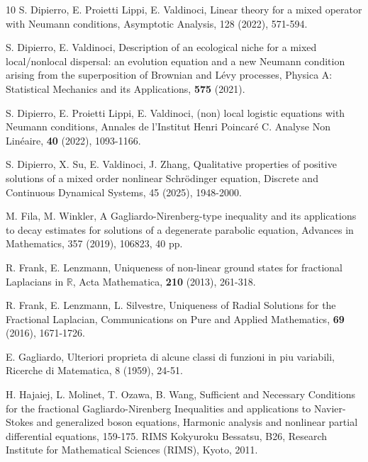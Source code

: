 \documentclass[12pt,a4paper,reqno]{amsart}
\numberwithin{equation}{section}
\begin{document}
\begin{thebibliography}{10}
S. Dipierro, E. Proietti Lippi, E. Valdinoci,
Linear theory for a mixed operator with Neumann conditions,
Asymptotic Analysis,
128 (2022), 571-594.

S. Dipierro, E. Valdinoci,
Description of an ecological niche for a mixed local/nonlocal dispersal: an evolution equation and a new Neumann condition arising from the superposition of Brownian and L\'{e}vy processes,
Physica A: Statistical Mechanics and its Applications,
\textbf{575} (2021).

S. Dipierro, E. Proietti Lippi, E. Valdinoci,
(non) local logistic equations with Neumann conditions,
Annales de l'Institut Henri Poincar\'{e} C. Analyse Non Lin\'{e}aire,
\textbf{40} (2022), 1093-1166.



S. Dipierro, X. Su, E. Valdinoci, J. Zhang,
Qualitative properties of positive solutions of a mixed order nonlinear Schr\"{o}dinger equation,
Discrete and Continuous Dynamical Systems,
45 (2025), 1948-2000.


M. Fila, M. Winkler,
A Gagliardo-Nirenberg-type inequality and its applications to decay estimates for solutions of a degenerate parabolic equation,
Advances in Mathematics,
357 (2019), 106823, 40 pp.


R. Frank, E. Lenzmann, Uniqueness of non-linear ground states
for fractional Laplacians in $\mathbb{R}$, Acta Mathematica, \textbf{210} (2013), 261-318.






R. Frank, E. Lenzmann, L. Silvestre, Uniqueness of Radial Solutions
for the Fractional Laplacian, Communications on Pure and Applied Mathematics, \textbf{69} (2016), 1671-1726.


E. Gagliardo, Ulteriori proprieta di alcune classi di funzioni in piu variabili, Ricerche di Matematica, 8 (1959), 24-51.

H. Hajaiej, L. Molinet, T. Ozawa,  B. Wang,
Sufficient and Necessary Conditions for the fractional Gagliardo-Nirenberg Inequalities and applications to Navier-Stokes and generalized boson equations,
Harmonic analysis and nonlinear partial differential equations, 159-175.
RIMS Kokyuroku Bessatsu, B26,
Research Institute for Mathematical Sciences (RIMS), Kyoto, 2011.


\end{thebibliography}
\end{document}
